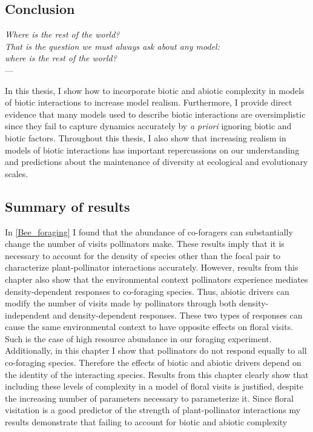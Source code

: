 \begin{refsection}
\chapter{Conclusion} %
\label{Conclusion}
\begin{flushright}{\slshape
    Where is the rest of the world? \\
    That is the question we must always ask about any model: \\
    where is the rest of the world?
    } \\ \medskip
    --- \textcite{levins2006strategies}
\end{flushright}

\bigskip

In this thesis, I show how to incorporate biotic and abiotic complexity in models of biotic interactions to increase model realism. Furthermore, I provide direct evidence that many models used to describe biotic interactions are oversimplistic since they fail to capture dynamics accurately by \textit{a priori} ignoring biotic and biotic factors. Throughout this thesis, I also show that increasing realism in models of biotic interactions has important repercussions on our understanding and predictions about the maintenance of diversity at ecological and evolutionary scales.

\section*{Summary of results}
In \autoref{Bee_foraging} I found that the abundance of co-foragers can substantially change the number of visits pollinators make. These results imply that it is necessary to account for the density of species other than the focal pair to characterize plant-pollinator interactions accurately. However, results from this chapter also show that the environmental context pollinators experience mediates density-dependent responses to co-foraging species. Thus, abiotic drivers can modify the number of visits made by pollinators through both density-independent and density-dependent responses. These two types of responses can cause the same environmental context to have opposite effects on floral visits. Such is the case of high resource abundance in our foraging experiment. Additionally, in this chapter I show that pollinators do not respond equally to all co-foraging species. Therefore the effects of biotic and abiotic drivers depend on the identity of the interacting species. Results from this chapter clearly show that including these levels of complexity in a model of floral visits is justified, despite the increasing number of parameters necessary to parameterize it. Since floral visitation is a good predictor of the strength of plant-pollinator interactions my results demonstrate that failing to account for biotic and abiotic complexity 


\end{refsection}
